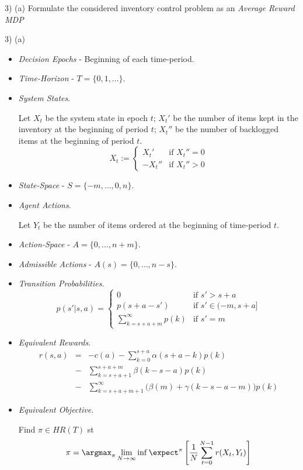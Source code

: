 \documentclass[11pt,a4paper]{article}
\begin{document}
\begin{question}{3) (a)}
  Formulate the considered inventory control problem as an \textit{Average Reward MDP}
\end{question}

\begin{answer}{3) (a)}
  \begin{itemize}
    \item \textit{Decision Epochs} - Beginning of each time-period.
    \item \textit{Time-Horizon} - $T=\{0,1,\dots\}$.
    \item \textit{System States}.
    \par Let $X_t$ be the system state in epoch $t$; $X_t'$ be the number of items kept in the inventory at the beginning of period $t$; $X_t''$ be the number of backlogged items at the beginning of period $t$.
    \[ X_t:=\begin{cases}X_t'&\text{if }X_t''=0\\-X_t''&\text{if }X_t''>0\end{cases} \]
    \item \textit{State-Space} - $S=\{-m,\dots,0,n\}$.
    \item \textit{Agent Actions}.
    \par Let $Y_t$ be the number of items ordered at the beginning of time-period $t$.
    \item \textit{Action-Space} - $A=\{0,\dots,n+m\}$.
    \item \textit{Admissible Actions} -  $A(s)=\{0,\dots,n-s\}$.
    \item \textit{Transition Probabilities}.
    \[ p(s'|s,a)=\begin{cases}0&\text{if }s'>s+a\\p(s+a-s')&\text{if }s'\in(-m,s+a]\\\sum_{k=s+a+m}^\infty p(k)&\text{if }s'=m\end{cases} \]
    \item \textit{Equivalent Rewards}.
    \[\begin{array}{rcl}
      r(s,a)&=&-c(a)-\sum_{k=0}^{s+a}\alpha(s+a-k)p(k)\\
      &-&\sum_{k=s+a+1}^{s+a+m}\beta(k-s-a)p(k)\\
      &-&\sum_{k=s+a+m+1}^\infty\big(\beta(m)+\gamma(k-s-a-m)\big)p(k)
    \end{array}\]
    \item \textit{Equivalent Objective}.
    \par Find $\pi\in HR(T)$ st
    \[ \pi=\argmax_\pi\lim_{N\to\infty}\inf\expect^\pi\left[\frac1N\sum_{t=0}^{N-1}r(X_t,Y_t)\right] \]
  \end{itemize}
\end{answer}
\end{document}
